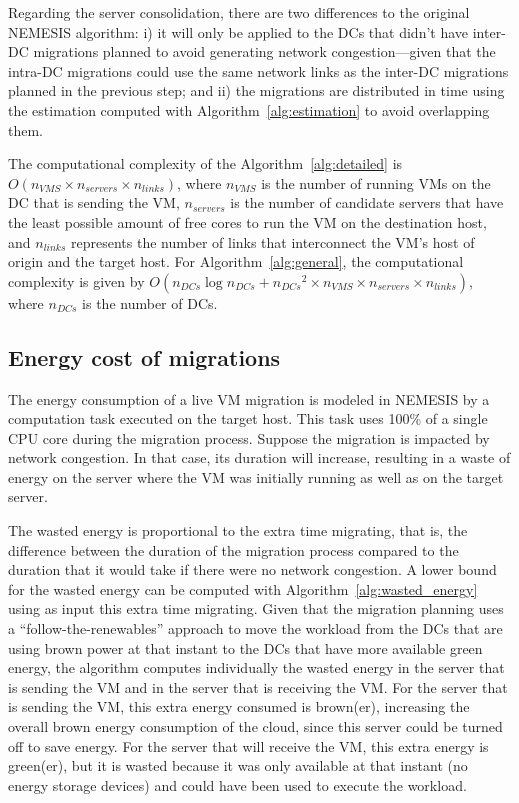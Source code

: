 Regarding the server consolidation, there are two differences to the original NEMESIS algorithm: i) it will only be applied to the DCs that didn't have inter-DC migrations planned to avoid generating network congestion---given that the intra-DC migrations could use the same network links as the inter-DC migrations planned in the previous step; and ii) the migrations are distributed in time using the estimation computed with Algorithm~\ref{alg:estimation} to avoid overlapping them.


The computational complexity of the Algorithm~\ref{alg:detailed} is $O(n_{VMS} \times  n_{servers} \times n_{links}  )$, where $n_{VMS}$ is the number of running VMs on the DC that is sending the VM, $n_{servers}$ is the number of candidate servers that have the least possible amount of free cores to run the VM on the destination host, and $n_{links}$ represents the number of links that interconnect the VM's host of origin and the target host. For Algorithm~\ref{alg:general}, the computational complexity is given by $O(n_{DCs}\log{}n_{DCs} + {n_{DCs}}^{2} \times n_{VMS} \times  n_{servers} \times n_{links})$, where $n_{DCs}$ is the number of DCs.

\subsection{Energy cost of migrations}\label{sec:energy_costs_mig}

The energy consumption of a live VM migration is modeled in NEMESIS by a computation task executed on the target host. This task uses 100\% of a single CPU core during the migration process. Suppose the migration is impacted by network congestion. In that case, its duration will increase, resulting in a waste of energy on the server where the VM was initially running as well as on the target server.


The wasted energy is proportional to the extra time migrating, that is, the difference between the duration of the migration process compared to the duration that it would take if there were no network congestion. A lower bound for the wasted energy can be computed with Algorithm~\ref{alg:wasted_energy} using as input this extra time migrating. Given that the migration planning uses a ``follow-the-renewables'' approach to move the workload from the DCs that are using brown power at that instant to the DCs that have more available green energy, the algorithm computes individually the wasted energy in the server that is sending the VM and in the server that is receiving the VM. For the server that is sending the VM, this extra energy consumed is brown(er), increasing the overall brown energy consumption of the cloud, since this server could be turned off to save energy. For the server that will receive the VM, this extra energy is green(er), but it is wasted because it was only available at that instant (no energy storage devices) and could have been used to execute the workload.


